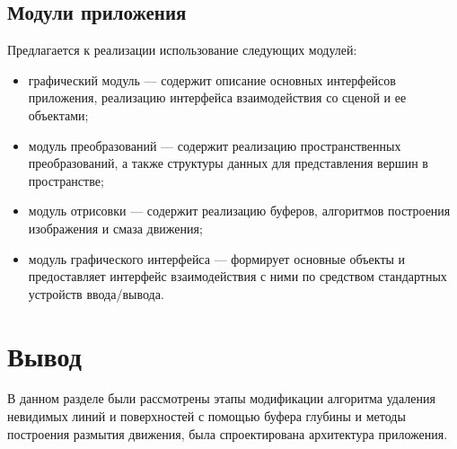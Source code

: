 \subsection{Модули приложения}

Предлагается к реализации использование следующих модулей:
\begin{itemize}
    \item графический модуль --- содержит описание основных интерфейсов приложения, реализацию интерфейса взаимодействия со сценой и ее объектами;
    \item модуль преобразований --- содержит реализацию пространственных преобразований, а также структуры данных для представления вершин в пространстве;
    \item модуль отрисовки --- содержит реализацию буферов, алгоритмов построения изображения и смаза движения;
    \item модуль графического интерфейса --- формирует основные объекты и предоставляет интерфейс взаимодействия с ними по средством стандартных устройств ввода/вывода. 

\end{itemize}


\section{Вывод}


В данном разделе были рассмотрены этапы модификации алгоритма удаления невидимых линий и поверхностей с помощью буфера глубины и методы построения размытия движения, была спроектирована архитектура приложения. 
